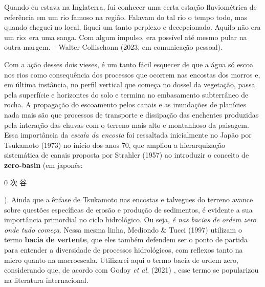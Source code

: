 \documentclass[./main.tex]{subfiles}
\begin{document}
\begin{adjustwidth}{100pt}{0pt}
\medskip
\small Quando eu estava na Inglaterra, fui conhecer uma certa estação fluviométrica de referência em um rio famoso na região. Falavam do tal rio o tempo todo, mas quando cheguei no local, fiquei um tanto perplexo e decepcionado. Aquilo não era um rio: era uma sanga. Com algum impulso, era possível até mesmo pular na outra margem. -- Walter Collischonn (2023, em comunicação pessoal).
\medskip
\end{adjustwidth}

\noindent Com a ação desses dois vieses, é um tanto fácil esquecer de que a água só escoa nos rios como consequência dos processos que ocorrem nas encostas dos morros e, em última instância, no perfil vertical que começa no dossel da vegetação, passa pela superfície e horizontes do solo e termina no embasamento subterrâneo de rocha. A propagação do escoamento pelos canais e as inundações de planícies nada mais são que processos de transporte e dissipação das enchentes produzidas pela interação das chuvas com o terreno mais alto e montanhoso da paisagem. Essa importância da \textit{escala da encosta} foi ressaltada inicialmente no Japão por Tsukamoto (1973) \cite{tsukamoto1973} no início dos anos 70, que ampliou a hierarquização sistemática de canais proposta por Strahler (1957) \cite{strahler1957} ao introduzir o conceito de \textbf{\gls{zero-basin}} (em japonês: \begin{CJK}{UTF8}{min}0 次 谷\end{CJK}). Ainda que a ênfase de Tsukamoto nas encostas e talvegues do terreno avance sobre questões específicas de erosão e produção de sedimentos, é evidente a sua importância primordial no ciclo hidrológico. Ou seja, \textit{é nas bacias de ordem zero onde tudo começa}. Nessa mesma linha, Mediondo \& Tucci (1997) \cite{mediondo1997} utilizam o termo \textbf{bacia de vertente}, que eles também defendem ser o ponto de partida para entender a diversidade de processos hidrológicos, com reflexos tanto na micro quanto na macroescala. Utilizarei aqui o termo bacia de ordem zero, considerando que, de acordo com Godoy \textit{et al.} (2021) \cite{godoy2021}, esse termo se popularizou na literatura internacional.
\end{document}
